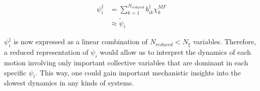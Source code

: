 \begin{spacing}{2.0}
    \begin{equation}\begin{aligned}
        \psi_i^{\ddagger} &= \sum_{k=1}^{N_{reduced}} b_{ik}^{\ddagger}\chi_k^{MF} \\
            &\approx \tilde{\psi}_i
    \end{aligned}\end{equation}

    $\psi_i^{\ddagger}$ is now expressed as a linear combination of $N_{reduced} < N_{\xi}$ variables.  Therefore, a reduced representation of
    $\psi_i$ would allow us to interpret the dynamics of each motion involving only important collective variables that are dominant in each 
    specific $\psi_i$. This way, one could gain important mechanistic insights into the slowest dynamics in any kinds of systems.
\end{spacing}

